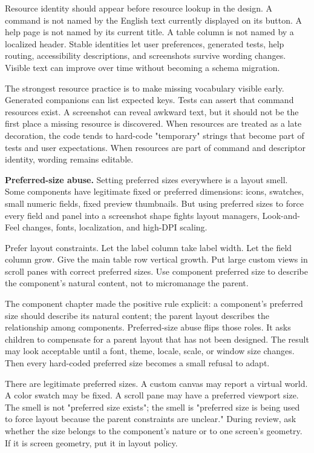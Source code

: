 Resource identity should appear before resource lookup in the design. A command
is not named by the English text currently displayed on its button. A help page
is not named by its current title. A table column is not named by a localized
header. Stable identities let user preferences, generated tests, help routing,
accessibility descriptions, and screenshots survive wording changes. Visible
text can improve over time without becoming a schema migration.

The strongest resource practice is to make missing vocabulary visible early.
Generated companions can list expected keys. Tests can assert that command
resources exist. A screenshot can reveal awkward text, but it should not be the
first place a missing resource is discovered. When resources are treated as a
late decoration, the code tends to hard-code "temporary" strings that become
part of tests and user expectations. When resources are part of command and
descriptor identity, wording remains editable.

\textbf{Preferred-size abuse.}
Setting preferred sizes everywhere is a layout smell. Some components have legitimate fixed or preferred dimensions: icons, swatches, small numeric fields, fixed preview thumbnails. But using preferred sizes to force every field and panel into a screenshot shape fights layout managers, Look-and-Feel changes, fonts, localization, and high-DPI scaling.

Prefer layout constraints. Let the label column take label width. Let the field column grow. Give the main table row vertical growth. Put large custom views in scroll panes with correct preferred sizes. Use component preferred size to describe the component's natural content, not to micromanage the parent.

The component chapter made the positive rule explicit: a component's preferred
size should describe its natural content; the parent layout describes the
relationship among components. Preferred-size abuse flips those roles. It asks
children to compensate for a parent layout that has not been designed. The
result may look acceptable until a font, theme, locale, scale, or window size
changes. Then every hard-coded preferred size becomes a small refusal to adapt.

There are legitimate preferred sizes. A custom canvas may report a virtual
world. A color swatch may be fixed. A scroll pane may have a preferred viewport
size. The smell is not "preferred size exists"; the smell is "preferred size is
being used to force layout because the parent constraints are unclear." During
review, ask whether the size belongs to the component's nature or to one
screen's geometry. If it is screen geometry, put it in layout policy.

